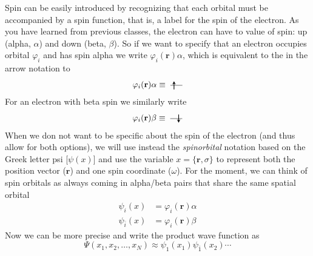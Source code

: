 \documentclass[../Main/chem371-notes.tex]{subfiles}
\begin{document}
Spin can be easily introduced by recognizing that each orbital must be accompanied by a spin function, that is, a label for the spin of the electron.
As you have learned from previous classes, the electron can have to value of spin: up (alpha, $\alpha$) and down (beta, $\beta$).
So if we want to specify that an electron occupies orbital $\varphi_i$ and has spin alpha we write $\varphi_i(\mathbf{r}) \alpha$, which is equivalent to the in the arrow notation to
\begin{equation}
\varphi_i(\mathbf{r}) \alpha
\equiv \;
\begin{tikzpicture}[baseline={([yshift=-.5ex]current bounding box.center)},]
    \draw (0,0.5) -- (0.5,0.5);
    \draw[thick,->,>=stealth] (0.15,0.325) -- (0.15,0.675);
\end{tikzpicture}
\end{equation}
For an electron with beta spin we similarly write
\begin{equation}
\varphi_i(\mathbf{r}) \beta
\equiv \;
\begin{tikzpicture}[baseline={([yshift=-.5ex]current bounding box.center)},]
    \draw (0,0.5) -- (0.5,0.5);
    \draw[thick,<-,>=stealth] (0.35,0.325) -- (0.35,0.675);    
\end{tikzpicture}
\end{equation}
When we don not want to be specific about the spin of the electron (and thus allow for both options), we will use instead the \emph{spinorbital} notation based on the Greek letter psi [$\psi(x)$] and use the variable $x = \{ \mathbf{r},\sigma\}$ to represent both the position vector ($\mathbf{r}$) and one spin coordinate ($\omega$).
For the moment, we can think of spin orbitals as always coming in alpha/beta pairs that share the same spatial orbital
\begin{align}
\psi_i(x) & = \varphi_i(\mathbf{r}) \alpha \\
\psi_{\bar{i}}(x) & = \varphi_i(\mathbf{r}) \beta
\end{align}
Now we can be more precise and write the product wave function as
\begin{equation}
\label{eq:hartree_prod_spin}
\Psi(x_1, x_2, \ldots, x_N) \approx \psi_1(x_1) \psi_{\bar{1}}(x_2) \cdots
\end{equation}
\end{document}
